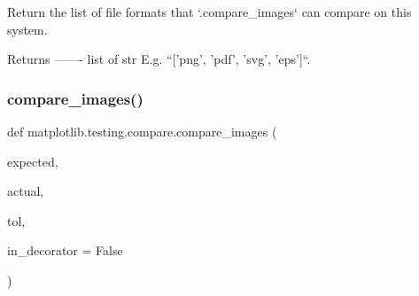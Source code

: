 \begin{DoxyVerb}Return the list of file formats that `.compare_images` can compare
on this system.

Returns
-------
list of str
    E.g. ``['png', 'pdf', 'svg', 'eps']``.\end{DoxyVerb}
 \mbox{\label{namespacematplotlib_1_1testing_1_1compare_a099a97a667c7cf9e562db6717243fb76}} 
\subsubsection{\texorpdfstring{compare\+\_\+images()}{compare\_images()}}
{\footnotesize\ttfamily def matplotlib.\+testing.\+compare.\+compare\+\_\+images (\begin{DoxyParamCaption}\item[{}]{expected,  }\item[{}]{actual,  }\item[{}]{tol,  }\item[{}]{in\+\_\+decorator = {\ttfamily False} }\end{DoxyParamCaption})}


